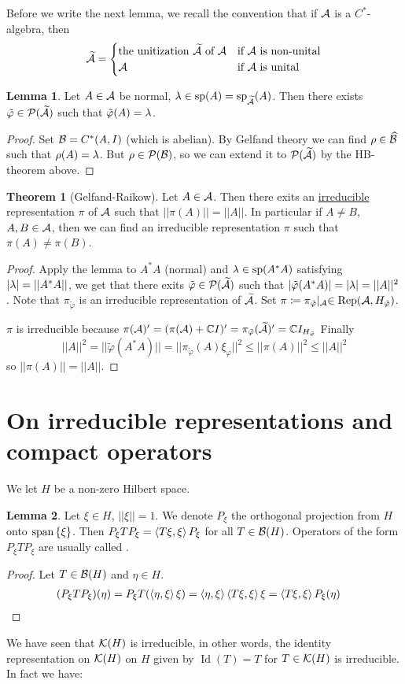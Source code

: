 \documentclass[10pt,english,a4paper]{article}
\theoremstyle{definition}
\newtheorem*{theorem}{Theorem}
\newtheorem*{lemma}{Lemma}
\let\emph\relax %
\def\tAs{\widetilde{\As}}
\def\tvphi{\tilde{\varphi}}
\def\xivp{\xi_{\vphi}}
\DeclareMathOperator{\Rep}{Rep}
\DeclareMathOperator{\Id}{Id}
\DeclareMathOperator{\Sp}{sp}
\def\vphi{\varphi}
\begin{document}
Before we write the next lemma, we recall the convention that if $\mathcal{A}$ is a $C^*$-algebra,
then 
\[\tAs = \begin{cases} \text{the unitization $\tAs$ of $\As$} &\text{if $\As$ is non-unital}\\
\As &\text{if $\As$ is unital} \end{cases} \]
\begin{lemma}
    Let $A \in \mathcal{A}$ be normal, $\la \in \Sp(A) = \Sp_{\tAs}(A)$. 
Then there exists $\tvphi \in \Ps(\tAs)$ such that $\tvphi (A) = \la$.
\end{lemma}
\begin{proof}
    Set $\mathcal{B} = C^*(A,I)$ (which is abelian). By Gelfand theory we can find
$\rho \in \widehat{\mathcal{B}}$ such that $\rho(A)= \lambda$.
But $\rho \in \mathcal{P}(\mathcal{B})$, so we can extend it to $\Ps(\tAs)$ by the HB-theorem above. 
\end{proof}

\begin{theorem}[Gelfand-Raikow]
    Let $A\in \mathcal{A}$. Then there exits an \ul{irreducible} representation 
$\pi$ of $\mathcal{A}$ such that $||\pi(A)|| = ||A||$.
In particular if $A\neq B$, $A,B\in \mathcal{A}$, then we can find an 
irreducible representation $\pi$ such that $\pi(A)\neq \pi(B)$. 
\end{theorem}
\begin{proof}
    Apply the lemma to $A^*A$ (normal) and $\la \in \Sp(A^*A)$
satisfying $|\lambda|= ||A^*A||$, we get that there exits $\tvphi \in \Ps(\tAs)$
such that $|\tvphi(A^*A)| = |\la| = ||A||^2$. Note that $\pi_{\tvphi}$
is an irreducible representation of $\tAs$. Set 
$\pi \coloneqq \pi_{\tvphi}\lvert_{\As} \in \Rep(\As,H_{\tvphi})$.

$\pi$ is irreducible because 
$\pi(\As)' = (\pi(\As) + \C I)' = \pi_{\tvphi}(\tAs)' = \C I_{H_{\tvphi}}$
Finally 
\[ ||A||^2 = ||\tvphi(A^*A)|| = ||\pi_{\tvphi}(A)\xivp||^2 \leq ||\pi(A)||^2 \leq ||A||^2 \]
so $||\pi(A)|| = ||A||$.
\end{proof}

\section{On irreducible representations and compact operators}

We let $H$ be a non-zero Hilbert space.

\begin{lemma}
    Let $\xi \in H$, $||\xi||=1$. We denote $P_{\xi}$ the orthogonal projection from 
$H$ onto $\text{span} \left\{\xi\right\}$. Then 
$P_{\xi}TP_{\xi} = \left\langle T\xi,\xi \right\rangle P_{\xi}$ for all $T \in \mathcal{B}(H)$. Operators of the form $P_{\xi}TP_{\xi}$ are usually called \emph{compressions}.
\end{lemma}
\begin{proof}
    Let $T \in \mathcal{B}(H)$ and $\eta \in H$. 
\begin{align*}
    (P_{\xi}TP_{\xi})(\eta) &= P_{\xi}T(\left\langle \eta,\xi \right\rangle\xi) = \left\langle \eta,\xi \right\rangle\left\langle T\xi,\xi \right\rangle\xi
= \left\langle T\xi,\xi \right\rangle P_{\xi}(\eta)
\end{align*}
\end{proof}
We have seen that $\mathcal{K}(H)$ is irreducible, in other words, the identity representation 
on $\mathcal{K}(H)$ on $H$ given by $\Id(T) = T$ for $T \in \mathcal{K}(H)$ is irreducible. In fact we have:
\end{document}

